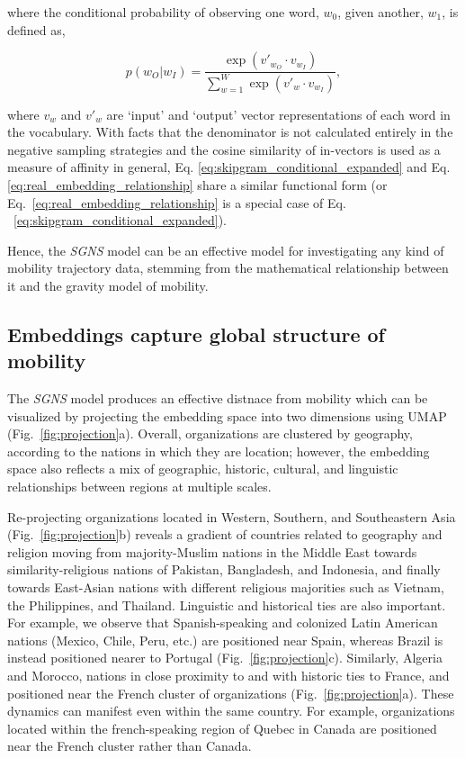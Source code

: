 \documentclass[12pt]{article} %
\def\SGNS{\textit{SGNS}}
\begin{document}
where the conditional probability of observing one word, $w_{0}$, given another, $w_{1}$, is defined as,

\begin{equation}
    \label{eq:skipgram_conditional_expanded}
    p(w_O|w_I) = \frac{\exp(v'_{w_O} \cdot v_{w_I})}{\sum_{w=1}^{W} \exp(v'_w \cdot v_{w_I})}, 
\end{equation}

where $v_w$ and $v'_w$ are `input' and `output' vector representations of each word in the vocabulary. With facts that the denominator is not calculated entirely in the negative sampling strategies and the cosine similarity of in-vectors is used as a measure of affinity in general, Eq. \ref{eq:skipgram_conditional_expanded} and Eq. \ref{eq:real_embedding_relationship} share a similar functional form (or Eq.~\ref{eq:real_embedding_relationship} is a special case of Eq. ~\ref{eq:skipgram_conditional_expanded}).

Hence, the \SGNS{} model can be an effective model for investigating any kind of mobility trajectory data, stemming from the mathematical relationship between it and the gravity model of mobility. 


%
%
\subsection*{Embeddings capture global structure of mobility}

The \SGNS{} model produces an effective distnace from mobility which can be visualized by projecting the embedding space into two dimensions using UMAP~\autocite{mcinnes2018umap} (Fig.~\ref{fig:projection}a).
Overall, organizations are clustered by geography, according to the nations in which they are location;
however, the embedding space also reflects a mix of geographic, historic, cultural, and linguistic relationships between regions at multiple scales.

Re-projecting organizations located in Western, Southern, and Southeastern Asia (Fig.~\ref{fig:projection}b) reveals a gradient of countries related to geography and religion moving from majority-Muslim nations in the Middle East towards similarity-religious nations of Pakistan, Bangladesh, and Indonesia, and finally towards East-Asian nations with different religious majorities such as Vietnam, the Philippines, and Thailand. 
Linguistic and historical ties are also important. 
For example, we observe that Spanish-speaking and colonized Latin American nations (Mexico, Chile, Peru, etc.) are positioned near Spain, whereas Brazil is instead positioned nearer to Portugal (Fig.~\ref{fig:projection}c). 
Similarly, Algeria and Morocco, nations in close proximity to and with historic ties to France, and positioned near the French cluster of organizations (Fig.~\ref{fig:projection}a). 
These dynamics can manifest even within the same country. 
For example, organizations located within the french-speaking region of Quebec in Canada are positioned near the French cluster rather than Canada.
\end{document}
